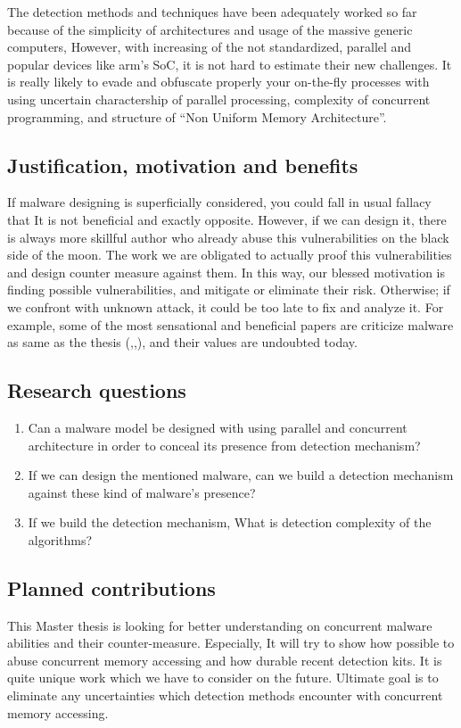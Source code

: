 The detection methods and techniques have been adequately worked so far because of the simplicity of architectures and usage of the massive generic computers, However, with increasing of the not standardized, parallel and popular devices like arm’s SoC, it is not hard to estimate their new challenges. It is really likely to evade and obfuscate properly your on-the-fly processes with using uncertain charactership of parallel processing, complexity of concurrent programming, and structure of “Non Uniform Memory Architecture”.


\subsection{Justification, motivation and benefits}
If malware designing is superficially considered, you could fall in usual fallacy that It is not beneficial and exactly opposite. However, if we can design it, there is always more skillful author who already abuse this vulnerabilities on the black side of the moon. The work we are obligated to actually proof this vulnerabilities and design counter measure against them. In this way, our blessed motivation is finding possible vulnerabilities, and mitigate or eliminate their risk. Otherwise; if we confront with unknown attack, it could be too late to fix and analyze it. For example, some of the most sensational and beneficial papers are criticize malware as same as the thesis (\cite{moser2007limits},\cite{cavallaro2008limits},\cite{egele2012survey}), and their values are undoubted today. 

\subsection{Research questions}\label{research:questions}

\begin{enumerate}
\item Can a malware model be designed with using parallel and concurrent architecture in order to conceal its presence from detection mechanism?
\item If we can design the mentioned malware, can we build a detection mechanism against these kind of malware's presence?
\item If we build the detection mechanism, What is detection complexity of the algorithms?
\end{enumerate}


\subsection{Planned contributions}
This Master thesis is looking for better understanding on concurrent malware abilities and their counter-measure. Especially, It will try to show how possible to abuse concurrent memory accessing and how durable recent detection kits. It is quite unique work which we have to consider on the future. Ultimate goal is to eliminate any uncertainties which detection methods encounter with concurrent memory accessing.

